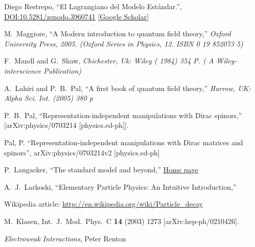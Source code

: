 \begin{thebibliography}{99}
 Diego Restrepo, ``El Lagrangiano del Modelo Estándar.'', \href{http://doi.org/10.5281/zenodo.3960741}{DOI:10.5281/zenodo.3960741} [\href{https://scholar.google.com/scholar_lookup?hl=en&title=El+Lagrangiano+del+Modelo+Estandar&author=D+Restrepo}{Google Scholar}]

  M.~Maggiore,
  ``A Modern introduction to quantum field theory,''
{\it  Oxford University Press, 2005. (Oxford Series in Physics, 12. ISBN 0 19 852073 5)}

  F.~Mandl and G.~Shaw,
{\it  Chichester, Uk: Wiley ( 1984) 354 P. ( A Wiley-interscience Publication)}

  A.~Lahiri and P.~B.~Pal,
  ``A first book of quantum field theory,''
  {\it  Harrow, UK: Alpha Sci. Int. (2005) 380 p}


P.~B.~Pal,
``Representation-independent manipulations with Dirac spinors,''
[arXiv:physics/0703214 [physics.ed-ph]].

 Pal, P. ``Representation-independent manipulations with Dirac matrices and spinors'',
	arXiv:physics/0703214v2 [physics.ed-ph]

P.~Langacker,
``The standard model and beyond,''
\href{https://web.sas.upenn.edu/pgl/standard-model-and-beyond-1st-edition/}{Home page}

A.~J.~Larkoski,
``Elementary Particle Physics: An Intuitive Introduction,''

        
 Wikipedia article: \url{http://en.wikipedia.org/wiki/Particle_decay}

  M.~Klasen,
  Int.\ J.\ Mod.\ Phys.\  C {\bf 14} (2003) 1273
  [arXiv:hep-ph/0210426].

 \emph{Electroweak Interactions}, Peter Renton



\end{thebibliography}
